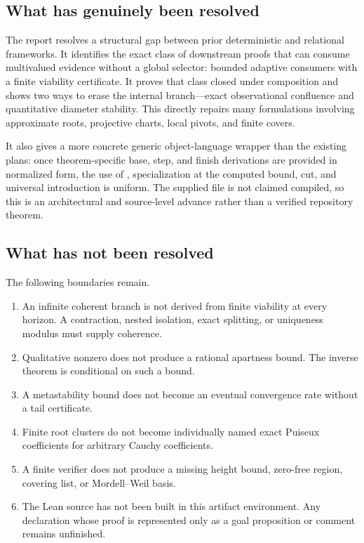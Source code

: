 \subsection{What has genuinely been resolved}

The report resolves a structural gap between prior deterministic and relational frameworks.  It identifies the exact class of downstream proofs that can consume multivalued evidence without a global selector: bounded adaptive consumers with a finite viability certificate.  It proves that class closed under composition and shows two ways to erase the internal branch---exact observational confluence and quantitative diameter stability.  This directly repairs many formulations involving approximate roots, projective charts, local pivots, and finite covers.

It also gives a more concrete generic object-language wrapper than the existing plans: once theorem-specific base, step, and finish derivations are provided in normalized form, the use of , specialization at the computed bound, cut, and universal introduction is uniform.  The supplied file is not claimed compiled, so this is an architectural and source-level advance rather than a verified repository theorem.

\subsection{What has not been resolved}

The following boundaries remain.

\begin{enumerate}[label=\arabic*.]
\item An infinite coherent branch is not derived from finite viability at every horizon.  A contraction, nested isolation, exact splitting, or uniqueness modulus must supply coherence.
\item Qualitative nonzero does not produce a rational apartness bound.  The inverse theorem is conditional on such a bound.
\item A metastability bound does not become an eventual convergence rate without a tail certificate.
\item Finite root clusters do not become individually named exact Puiseux coefficients for arbitrary Cauchy coefficients.
\item A finite verifier does not produce a missing height bound, zero-free region, covering list, or Mordell--Weil basis.
\item The Lean source has not been built in this artifact environment.  Any declaration whose proof is represented only as a goal proposition or comment remains unfinished.
\end{enumerate}

